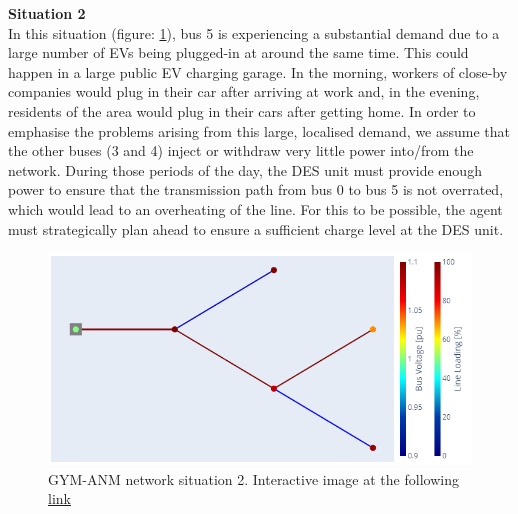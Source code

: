 \noindent \textbf{Situation 2} \\
    In this situation (figure: \ref{fig:net_sit2}), bus 5 is experiencing a substantial demand due to a large number
    of EVs being plugged-in at around the same time. This could happen in a large public EV charging garage. In the morning, workers of close-by companies would plug in their car after arriving at work and, in the evening, residents of the area would plug in their cars after getting home. In order to emphasise the problems arising from this large, localised demand, we assume that the other buses (3 and 4) inject or withdraw very little power into/from the network. During those periods of the day, the DES unit must provide enough power to ensure that the transmission path from bus 0 to bus 5 is not overrated, which would lead to an overheating of the line. For this to be possible, the agent must strategically plan ahead to ensure a sufficient charge level
    at the \gls{DES} unit.
    \begin{figure}[h]
    \centering
        \includegraphics[width=.7\linewidth]{images/GYM-ANM/NETS/Gyn-anm network situation2.png}
    \caption[GYM-ANM network situation 2]{GYM-ANM network situation 2. Interactive image at the following \href{https://htmlpreview.github.io/?https://github.com/MauriVass/ThesisLiege/blob/master/Images/fig_case2.html}{link}}
    \label{fig:net_sit2}
    \end{figure}
    
